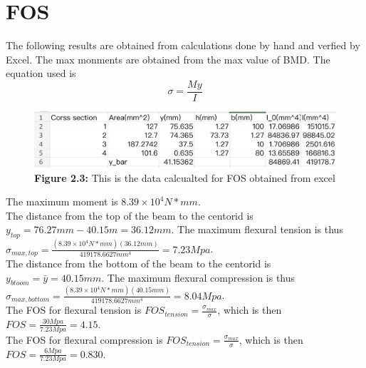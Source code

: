 \documentclass[12pt,titlepage,a4paper]{article}
\begin{document}
    \section{FOS}
        The following results are obtained from calculations done by hand and verfied by Excel. 
        The max monments are obtained from the max value of BMD. The equation used is
        \begin{equation}
            \sigma = \frac{My}{I}
        \end{equation}
        \begin{figure}[H]
            \centering
            \includegraphics[width=13cm]{m_and_centorid.png}
            \caption*{\textbf{Figure 2.3:} This is the data calcualted for FOS obtained from excel}
            \label{fig:enter-label}
        \end{figure}
        The maximum moment is $8.39\times10^4 N*mm$. \\The distance from the top of the beam to the centorid is 
        $y_{top} = 76.27mm - 40.15m = 36.12mm$. The maximum flexural tension is thus $\sigma_{max, top} = \frac{(8.39\times10^4 N*mm)
        (36.12mm)}{419178.6627mm^4} = 7.23Mpa$. \\The distance from the bottom of the beam to the centorid is 
        $y_{btoom} = \bar{y} = 40.15mm$. The maximum flexural compression is thus $\sigma_{max, bottom} = \frac{(8.39\times10^4 N*mm)
        (40.15mm)}{419178.6627mm^4} = 8.04Mpa$. \\
        The FOS for flexural tension is $FOS_{tension} = \frac{\sigma_{max}}{\sigma}$, which is then $FOS = \frac{30Mpa}{7.23Mpa} = 4.15$.
        \\The FOS for flexural compression is $FOS_{tension} = \frac{\sigma_{max}}{\sigma}$, which is then $FOS = \frac{6Mpa}{7.23Mpa} = 0.830$.
\end{document}
